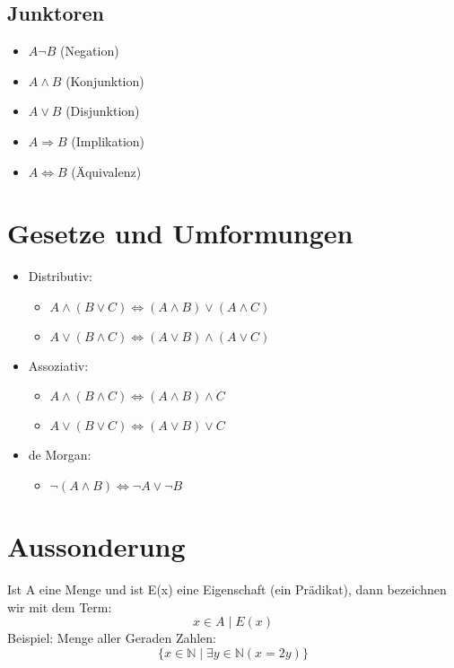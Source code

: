 \subsection{Junktoren}
\begin{itemize}
    \item \(A \neg B\) (Negation)
    \item \(A \wedge B\) (Konjunktion)
    \item \(A \vee B\) (Disjunktion)
    \item \(A \Rightarrow B\) (Implikation)
    \item \(A \Leftrightarrow B\) (Äquivalenz)
\end{itemize}

\section{Gesetze und Umformungen}
\begin{itemize}
    \item Distributiv:
        \begin{itemize}
            \item \(A \wedge (B \vee C) \Leftrightarrow (A \wedge B) \vee (A \wedge C)\)
            \item \(A \vee (B \wedge C) \Leftrightarrow (A \vee B) \wedge (A \vee C)\)
        \end{itemize}
    
    \item Assoziativ:
        \begin{itemize}
            \item \(A \wedge (B \wedge C) \Leftrightarrow (A \wedge B) \wedge C\)
            \item \(A \vee (B \vee C) \Leftrightarrow (A \vee B) \vee C\)
        \end{itemize}
    
    \item de Morgan:
        \begin{itemize}
            \item \(\neg (A \wedge B) \Leftrightarrow \neg A \vee \neg B\)
        \end{itemize}
\end{itemize}

\section{Aussonderung}
Ist A eine Menge und ist E(x) eine Eigenschaft (ein Prädikat), dann
bezeichnen wir mit dem Term:
\begin{equation}
    x \in A \mid E(x)
\end{equation}
Beispiel: Menge aller Geraden Zahlen:
\begin{equation}
    \{x \in \mathbb{N} \mid \exists{y} \in \mathbb{N}(x= 2y)\}
\end{equation}
